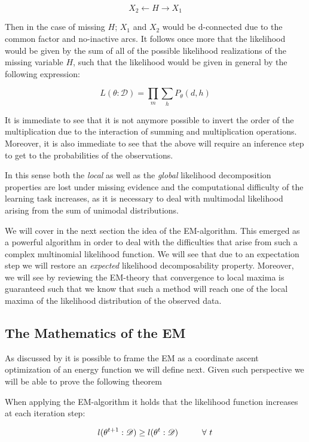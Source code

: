 \documentclass[11pt]{article}
\begin{document}
\begin{article}
$$ X_2 \leftarrow  H \rightarrow X_1 $$

Then in the case of missing \(H\); \(X_1\) and \(X_2\) would be
d-connected due to the common factor and no-inactive arcs. It
follows once more that the likelihood would be given by the sum of
all of the possible likelihood realizations of the missing variable
\(H\), such that the likelihood would be given in general by the
following expression:

$$ L(\theta: \mathscr{D}) = \prod_m \sum_h P_\theta(d, h)$$

It is immediate to see that it is not anymore possible to invert
the order of the multiplication due to the interaction of summing
and multiplication operations. Moreover, it is also immediate to
see that the above will require an inference step to get to the
probabilities of the observations.

In this sense both the \emph{local} as well as the \emph{global} likelihood
decomposition properties are lost under missing evidence and the
computational difficulty of the learning task increases, as it is
necessary to deal with multimodal likelihood arising from the sum
of unimodal distributions.

We will cover in the next section the idea of the
EM-algorithm. This emerged as a powerful algorithm in order to deal
with the difficulties that arise from such a complex multinomial
likelihood function. We will see that due to an expectation step we
will restore an \emph{expected} likelihood decomposability
property. Moreover, we will see by reviewing the EM-theory that
convergence to local maxima is guaranteed such that we know that
such a method will reach one of the local maxima of the likelihood
distribution of the observed data.


\subsection{The Mathematics of the EM}
\label{math_em}
As discussed by \cite{koller2009probabilistic} it is possible to frame
the EM as a coordinate ascent optimization of an energy function we
will define next. Given such perspective we will be able to prove the
following theorem

\begin{theorem}\label{thm:one}
When applying the EM-algorithm it holds that the likelihood function increases at each iteration step:

$$l(\theta^{t+1} : \mathscr{D}) \geq l(\theta^{t} : \mathscr{D}) \hspace*{1cm} \forall \ t$$
\end{theorem}


\end{article}
\end{document}
